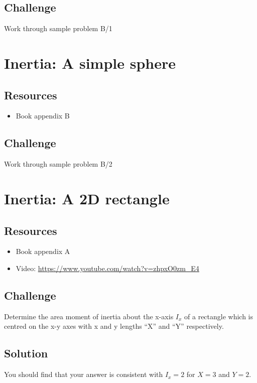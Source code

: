 \subsection*{Challenge}
Work through sample problem B/1




\newpage
\section{Inertia: A simple sphere}

\subsection*{Resources}
\begin{itemize}
    \item Book appendix B
\end{itemize}

\subsection*{Challenge}
Work through sample problem B/2




\newpage
\section{Inertia: A 2D rectangle}

\subsection*{Resources}
\begin{itemize}
    \item Book appendix A
    \item Video: \url{https://www.youtube.com/watch?v=zhpxO0zm_E4}
\end{itemize}

\subsection*{Challenge}
Determine the area moment of inertia about the x-axis $I_x$ of a rectangle which is centred on the x-y axes with x and y lengths ``X'' and ``Y'' respectively.

\subsection*{Solution}
You should find that your answer is consistent with $I_x = 2$ for $X=3$ and $Y=2$.




